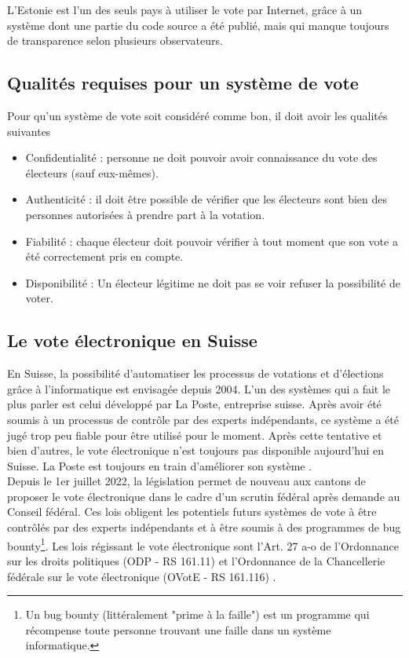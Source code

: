 \documentclass[10pt,a4paper,twoside]{article}
\numberwithin{equation}{section}
\begin{document}
		L'Estonie est l'un des seuls pays à utiliser le vote par Internet, grâce à un système dont une partie du code source a été publié, mais qui manque toujours de transparence selon plusieurs observateurs. \cite{wiki:Vote_electronique}
	
	\subsection{Qualités requises pour un système de vote} \label{critères}
		Pour qu'un système de vote soit considéré comme bon, il doit avoir les qualités suivantes \cite{dvoting} 
		\begin{itemize}
			\item Confidentialité : personne ne doit pouvoir avoir connaissance du vote des électeurs (sauf eux-mêmes).
			\item Authenticité : il doit être possible de vérifier que les électeurs sont bien des personnes autorisées à prendre part à la votation.
			\item Fiabilité : chaque électeur doit pouvoir vérifier à tout moment que son vote a été correctement pris en compte.
			\item Disponibilité : Un électeur légitime ne doit pas se voir refuser la possibilité de voter.
		\end{itemize} 
	\subsection{Le vote électronique en Suisse}
		En Suisse, la possibilité d'automatiser les processus de votations et d'élections grâce à l'informatique est envisagée depuis 2004. L'un des systèmes qui a fait le plus parler est celui développé par La Poste, entreprise suisse. Après avoir été soumis à un processus de contrôle par des experts indépendants, ce système a été jugé trop peu fiable pour être utilisé pour le moment. Après cette tentative et bien d'autres, le vote électronique n'est toujours pas disponible aujourd'hui en Suisse. La Poste est toujours en train d'améliorer son système \cite{chf}.\\
		
		Depuis le 1er juillet 2022, la législation permet de nouveau aux cantons de proposer le vote électronique dans le cadre d'un scrutin fédéral après demande au Conseil fédéral. Ces lois obligent les potentiels futurs systèmes de vote à être contrôlés par des experts indépendants et à être soumis à des programmes de bug bounty\footnote{Un bug bounty (littéralement "prime à la faille") est un programme qui récompense toute personne trouvant une faille dans un système informatique.}. Les lois régissant le vote électronique sont l'Art. 27 a-o de l'Ordonnance sur les droits politiques  (ODP - RS 161.11) et l'Ordonnance de la Chancellerie fédérale sur le vote électronique (OVotE - RS 161.116) \cite{chf}.
		
\end{document}
